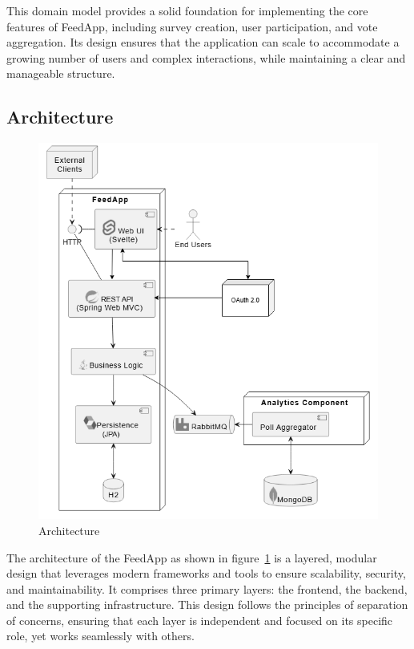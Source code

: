 \noindent
This domain model provides a solid foundation for implementing the core features of FeedApp, including survey creation, user participation, and vote aggregation. Its design ensures that the application can scale to accommodate a growing number of users and complex interactions, while maintaining a clear and manageable structure.

\subsection{Architecture}
\begin{figure}[!htbp]
	\centering
	\includegraphics[scale=0.5]{figs/architecture.png}
	\caption{Architecture}
	\label{fig:architecture}
\end{figure}

\medskip

\noindent
The architecture of the FeedApp as shown in figure~\ref{fig:architecture}  is a layered, modular design that leverages modern frameworks and tools to ensure scalability, security, and maintainability. It comprises three primary layers: the frontend, the backend, and the supporting infrastructure. This design follows the principles of separation of concerns, ensuring that each layer is independent and focused on its specific role, yet works seamlessly with others.
\medskip

